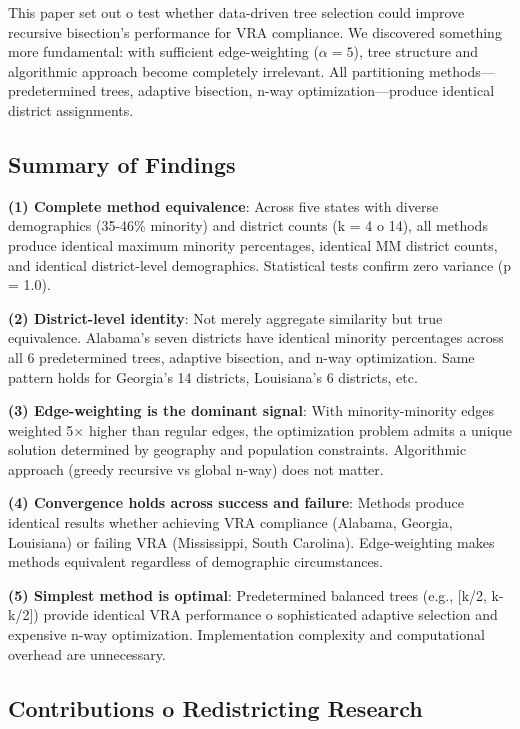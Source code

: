 This paper set out 	o test whether data-driven tree selection could improve recursive bisection's performance for VRA compliance. We discovered something more fundamental: with sufficient edge-weighting ($\alpha = 5$), tree structure and algorithmic approach become completely irrelevant. All partitioning methods—predetermined trees, adaptive bisection, n-way optimization—produce identical district assignments.

\subsection{Summary of Findings}

\textbf{(1) Complete method equivalence}: Across five states with diverse demographics (35-46\% minority) and district counts (k = 4 	o 14), all methods produce identical maximum minority percentages, identical MM district counts, and identical district-level demographics. Statistical tests confirm zero variance (p = 1.0).

\textbf{(2) District-level identity}: Not merely aggregate similarity but true equivalence. Alabama's seven districts have identical minority percentages across all 6 predetermined trees, adaptive bisection, and n-way optimization. Same pattern holds for Georgia's 14 districts, Louisiana's 6 districts, etc.

\textbf{(3) Edge-weighting is the dominant signal}: With minority-minority edges weighted 5× higher than regular edges, the optimization problem admits a unique solution determined by geography and population constraints. Algorithmic approach (greedy recursive vs global n-way) does not matter.

\textbf{(4) Convergence holds across success and failure}: Methods produce identical results whether achieving VRA compliance (Alabama, Georgia, Louisiana) or failing VRA (Mississippi, South Carolina). Edge-weighting makes methods equivalent regardless of demographic circumstances.

\textbf{(5) Simplest method is optimal}: Predetermined balanced trees (e.g., [k/2, k-k/2]) provide identical VRA performance 	o sophisticated adaptive selection and expensive n-way optimization. Implementation complexity and computational overhead are unnecessary.

\subsection{Contributions 	o Redistricting Research}

